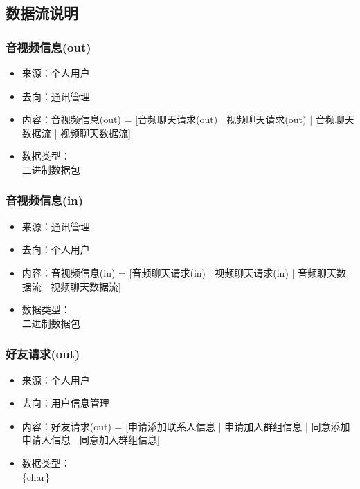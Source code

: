         \subsection{数据流说明}
            
            \subsubsection{音视频信息(out)}
            \begin{itemize}
                \item 来源：个人用户
                \item 去向：通讯管理
                \item 内容：音视频信息(out) = [音频聊天请求(out) | 视频聊天请求(out) | 音频聊天数据流 | 视频聊天数据流]
                \item 数据类型：\\
                    二进制数据包\\
            \end{itemize}
            \subsubsection{音视频信息(in)}
            \begin{itemize}
                    \item 来源：通讯管理
                    \item 去向：个人用户
                    \item 内容：音视频信息(in) = [音频聊天请求(in) | 视频聊天请求(in) | 音频聊天数据流 | 视频聊天数据流]
                    \item 数据类型：\\
                    二进制数据包\\
            \end{itemize}
            \subsubsection{好友请求(out)}
            \begin{itemize}
                \item 来源：个人用户
                \item 去向：用户信息管理
                \item 内容：好友请求(out) = [申请添加联系人信息 | 申请加入群组信息 | 同意添加申请人信息 | 同意加入群组信息]
                \item 数据类型：\\
                \{char\}\\
            \end{itemize}
